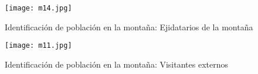 \begin{figure}[h!]
\centering
  \texttt{[image: m14.jpg]}
  \caption{Identificación de población en la montaña: Ejidatarios de la montaña}
  \label{m14}
\end{figure}

\begin{figure}[h!]
\centering
  \texttt{[image: m11.jpg]}
  \caption{Identificación de población en la montaña: Visitantes externos}
  \label{m11}
\end{figure}


\newpage













